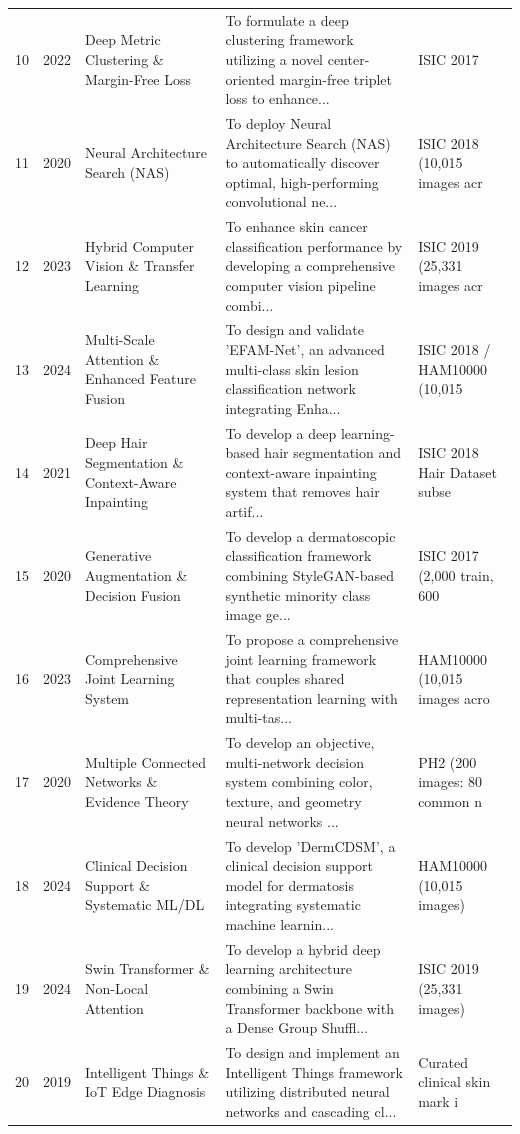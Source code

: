 \documentclass[10pt,a4paper]{article}
\begin{document}
\begin{longtable}{p{0.6cm} p{1.2cm} p{3.2cm} p{7.0cm} p{2.8cm}}
10 & 2022 & Deep Metric Clustering \& Margin-Free Loss & To formulate a deep clustering framework utilizing a novel center-oriented margin-free triplet loss to enhance... & ISIC 2017 \\
11 & 2020 & Neural Architecture Search (NAS) & To deploy Neural Architecture Search (NAS) to automatically discover optimal, high-performing convolutional ne... & ISIC 2018 (10,015 images acr \\
12 & 2023 & Hybrid Computer Vision \& Transfer Learning & To enhance skin cancer classification performance by developing a comprehensive computer vision pipeline combi... & ISIC 2019 (25,331 images acr \\
13 & 2024 & Multi-Scale Attention \& Enhanced Feature Fusion & To design and validate 'EFAM-Net', an advanced multi-class skin lesion classification network integrating Enha... & ISIC 2018 / HAM10000 (10,015 \\
14 & 2021 & Deep Hair Segmentation \& Context-Aware Inpainting & To develop a deep learning-based hair segmentation and context-aware inpainting system that removes hair artif... & ISIC 2018 Hair Dataset subse \\
15 & 2020 & Generative Augmentation \& Decision Fusion & To develop a dermatoscopic classification framework combining StyleGAN-based synthetic minority class image ge... & ISIC 2017 (2,000 train, 600  \\
16 & 2023 & Comprehensive Joint Learning System & To propose a comprehensive joint learning framework that couples shared representation learning with multi-tas... & HAM10000 (10,015 images acro \\
17 & 2020 & Multiple Connected Networks \& Evidence Theory & To develop an objective, multi-network decision system combining color, texture, and geometry neural networks ... & PH2 (200 images: 80 common n \\
18 & 2024 & Clinical Decision Support \& Systematic ML/DL & To develop 'DermCDSM', a clinical decision support model for dermatosis integrating systematic machine learnin... & HAM10000 (10,015 images) \\
19 & 2024 & Swin Transformer \& Non-Local Attention & To develop a hybrid deep learning architecture combining a Swin Transformer backbone with a Dense Group Shuffl... & ISIC 2019 (25,331 images) \\
20 & 2019 & Intelligent Things \& IoT Edge Diagnosis & To design and implement an Intelligent Things framework utilizing distributed neural networks and cascading cl... & Curated clinical skin mark i \\

\end{longtable}
\end{document}
